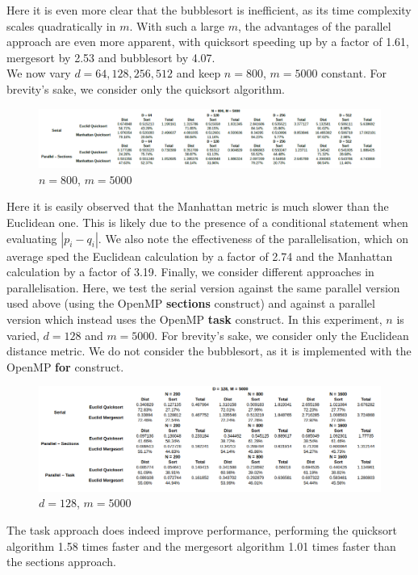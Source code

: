 \documentclass[10pt]{article}
\begin{document}
Here it is even more clear that the bubblesort is inefficient, as its time complexity scales quadratically in $m$. With such a large $m$, the advantages of the parallel approach are even more apparent, with quicksort speeding up by a factor of 1.61, mergesort by 2.53 and bubblesort by 4.07.
\\
We now vary $d = 64, 128, 256, 512$ and keep $n=800$, $m=5000$ constant. For brevity's sake, we consider only the quicksort algorithm.
\begin{figure}[H]
\caption{$n=800$, $m=5000$}
\centering
\includegraphics[width=\textwidth]{n800m5000.png}
\end{figure}
Here it is easily observed that the Manhattan metric is much slower than the Euclidean one. This is likely due to the presence of a conditional statement when evaluating $|p_{i}-q_{i}|$. We also note the effectiveness of the parallelisation, which on average sped the Euclidean calculation by a factor of 2.74 and the Manhattan calculation by a factor of 3.19.
\newpage
Finally, we consider different approaches in parallelisation. Here, we test the serial version against the same parallel version used above (using the OpenMP \textbf{sections} construct) and against a parallel version which instead uses the OpenMP \textbf{task} construct. In this experiment, $n$ is varied, $d = 128$ and $m = 5000$. For brevity's sake, we consider only the Euclidean distance metric. We do not consider the bubblesort, as it is implemented with the OpenMP \textbf{for} construct.
\begin{figure}[H]
\caption{$d = 128$, $m=5000$}
\centering
\includegraphics[width=\textwidth]{d128m5000.png}
\end{figure}
The task approach does indeed improve performance, performing the quicksort algorithm 1.58 times faster and the mergesort algorithm 1.01 times faster than the sections approach.
\end{document}
